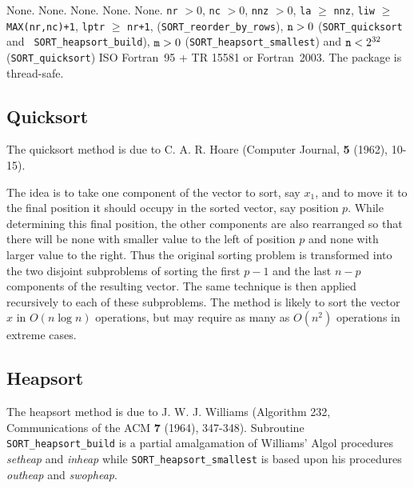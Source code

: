 \documentclass{galahad}
\newcommand{\packagename}{SORT}
\begin{document}
\galcommon None.
\galworkspace None.
\galroutines None. 
\galmodules None.
\galio None.
\galrestrictions 
{\tt nr} $> 0$,
{\tt nc} $> 0$,
{\tt nnz} $> 0$,
{\tt la} $\geq$ {\tt nnz},
{\tt liw} $\geq$ {\tt MAX(nr,nc)+1},
{\tt lptr} $\geq$ {\tt nr+1},
({\tt \packagename\_reorder\_by\_rows}),
${\tt n} > 0$ ({\tt \packagename\_quicksort} and {\tt
\packagename\_heapsort\_build}), 
${\tt m} > 0$ ({\tt \packagename\_heapsort\_smallest}) and
${\tt n} < 2^{32}$ \\ ({\tt \packagename\_quicksort})
\galportability ISO Fortran~95 + TR 15581 or Fortran~2003. 
The package is thread-safe.


\galmethod

\subsection{Quicksort}

The quicksort method is due to C. A. R. Hoare (Computer Journal, {\bf 5 }
(1962), 10-15).

\noindent
The idea is to take one component of the vector to sort, say $x_1$, and to
move it to the final position it should occupy in the sorted vector, say
position $p$. While determining this final position, the other components are
also rearranged so that there will be none with smaller value to the left of
position $p$ and none with larger value to the right. Thus the original
sorting problem is transformed into the two disjoint subproblems of sorting the
first $p-1$ and the last $n-p$ components of the resulting vector. The same
technique is then applied recursively to each of these subproblems.
The method is likely to sort the vector $x$ in $O( n \log n )$ operations,
but may require as many as $O( n^2 )$ operations in extreme cases.

\subsection{Heapsort}

The heapsort method is due to J. W. J.  Williams (Algorithm 232, 
Communications of the ACM 
{\bf 7 } (1964), 347-348).  Subroutine {\tt \packagename\_heapsort\_build} 
is a partial amalgamation of Williams' Algol procedures {\em setheap} 
and {\em inheap} while {\tt \packagename\_heapsort\_smallest}
is based upon his procedures {\em outheap} and {\em swopheap}.
\end{document}
